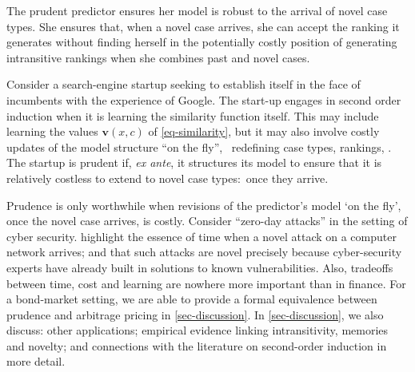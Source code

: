\documentclass[12pt,a4paper,twoside]{article}
\begin{document}
The prudent predictor  ensures her model is robust to the arrival of novel case
types. She ensures that, when a novel case arrives, she can accept the ranking
it generates without finding herself in the potentially costly position of
generating intransitive rankings when she combines past and novel cases.

\begin{example}\label{eg-second-order}
  Consider a search-engine startup seeking to establish itself in the face of
  incumbents with the experience of Google. The start-up engages in second order
  induction when it is learning the similarity function itself. This may include
  learning the values $\mathbf{v}(x,c)$ of \cref{eq-similarity}, but it may
  also involve costly updates of the model structure ``on the fly'', \eg\
  redefining case types, rankings, \etc. The startup is prudent if, \emph{ex
    ante}, it structures its model to ensure that it is relatively costless to
  extend to novel case types$:$ once they arrive.
\end{example}

Prudence is only worthwhile when revisions of the predictor's model `on the fly',
once the novel case arrives, is costly.  %
Consider ``zero-day attacks'' in the setting of cyber security.
 highlight the essence of time when a novel
attack on a computer network arrives; and that such attacks are novel precisely
because cyber-security experts have already built in solutions to known
vulnerabilities. Also, tradeoffs between time, cost and learning are nowhere
more important than in finance. For a bond-market setting, we are able to
provide a formal equivalence between prudence and arbitrage pricing in
\cref{sec-discussion}.  In \cref{sec-discussion}, we also discuss: other
applications; empirical evidence linking intransitivity, memories and novelty;
and connections with the literature on second-order induction in more detail.



\end{document}
